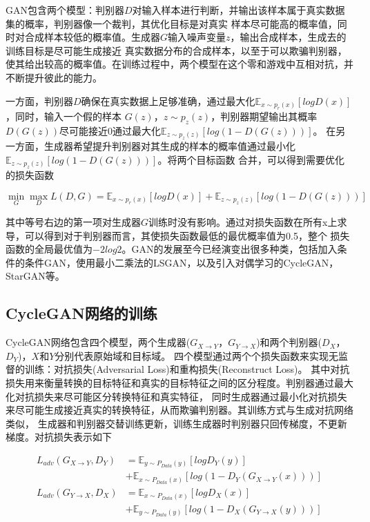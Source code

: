 GAN包含两个模型：判别器$D$对输入样本进行判断，并输出该样本属于真实数据集的概率，判别器像一个裁判，其优化目标是对真实
样本尽可能高的概率值，同时对合成样本较低的概率值。生成器$G$输入噪声变量$z$，输出合成样本，生成去的训练目标是尽可能生成接近
真实数据分布的合成样本，以至于可以欺骗判别器，使其给出较高的概率值。在训练过程中，两个模型在这个零和游戏中互相对抗，并不断提升彼此的能力。

一方面，判别器$D$确保在真实数据上足够准确，通过最大化$\mathbb{E}_{x\sim p_r(x)}\left[log D(x)\right]$，同时，输入一个假的样本
$G(z)$，$z\sim p_z(z)$，判别器期望输出其概率$D(G(z))$尽可能接近$0$通过最大化$\mathbb{E}_{z\sim p_z(z)}\left[log(1-D(G(z)))\right]$。
在另一方面，生成器希望提升判别器对其生成的样本的概率值通过最小化$\mathbb{E}_{z\sim p_z(z)}\left[log(1-D(G(z)))\right]$。将两个目标函数
合并，可以得到需要优化的损失函数

\begin{equation}
    \min_G \max_D L(D,G)=\mathbb{E}_{x\sim p_r(x)}\left[log D(x)\right] + \mathbb{E}_{z\sim p_z(z)}\left[log(1-D(G(z)))\right]
\end{equation}

其中等号右边的第一项对生成器$G$训练时没有影响。通过对损失函数在所有x上求导，可以得到对于判别器而言，其使损失函数最低的最优概率值为0.5，整个
损失函数的全局最优值为$-2log2$。GAN的发展至今已经演变出很多种类，包括加入条件的条件GAN，使用最小二乘法的LSGAN，以及引入对偶学习的CycleGAN，StarGAN等。

\subsection{CycleGAN网络的训练}
CycleGAN网络包含四个模型，两个生成器($G_{X\rightarrow Y}$，$G_{Y\rightarrow X}$)和两个判别器($D_X$，$D_Y$)，$X$和$Y$分别代表原始域和目标域。
四个模型通过两个个损失函数来实现无监督的训练：对抗损失(Adversarial Loss)和重构损失(Reconstruct Loss)。
其中对抗损失用来衡量转换的目标特征和真实的目标特征之间的区分程度。判别器通过最大化对抗损失来尽可能区分转换特征和真实特征，
同时生成器通过最小化对抗损失来尽可能生成接近真实的转换特征，从而欺骗判别器。其训练方式与生成对抗网络类似，
生成器和判别器交替训练更新，训练生成器时判别器只回传梯度，不更新梯度。对抗损失表示如下

\begin{align}
    L_{adv}(G_{X\rightarrow Y},D_Y) & =\mathbb{E}_{y\sim P_{Data}(y)}\left[log D_Y(y)\right] \\
    & + \mathbb{E}_{x\sim P_{Data}(x)}\left[log(1-D_Y(G_{X\rightarrow Y}(x)))\right] \\
    L_{adv}(G_{Y\rightarrow X},D_X) & =\mathbb{E}_{x\sim P_{Data}(x)}\left[log D_X(x)\right] \\
    & + \mathbb{E}_{y\sim P_{Data}(y)}\left[log(1-D_X(G_{Y\rightarrow X}(y)))\right] \\
\end{align}


